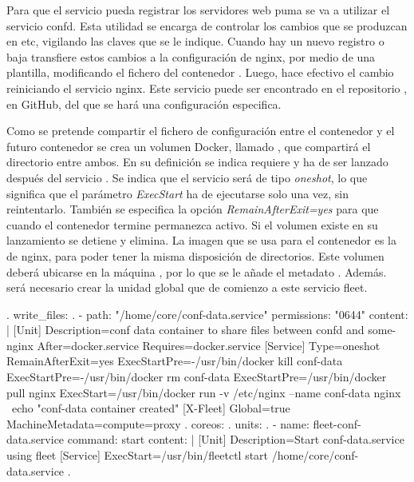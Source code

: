 Para que el servicio  pueda registrar los servidores web puma se va a utilizar el servicio confd. Esta utilidad se encarga de controlar los cambios que se produzcan en etc, vigilando las claves que se le indique. Cuando hay un nuevo registro o baja transfiere estos cambios a la configuración de nginx, por medio de una plantilla, modificando el fichero  del contenedor . Luego, hace efectivo el cambio reiniciando el servicio nginx. Este servicio puede ser encontrado en el repositorio , en GitHub, del que se hará una configuración especifica.

Como se pretende compartir el fichero de configuración  entre el contenedor  y el futuro contenedor  se crea un volumen Docker, llamado , que compartirá el directorio  entre ambos. En su definición se indica requiere y ha de ser lanzado después del servicio . Se indica que el servicio será de tipo \textit{oneshot}, lo que significa que el parámetro \textit{ExecStart} ha de ejecutarse solo una vez, sin reintentarlo. También se especifica la opción \textit{RemainAfterExit=yes} para que cuando el contenedor termine permanezca activo. Si el volumen existe en su lanzamiento se detiene y elimina. La imagen que se usa para el contenedor es la de nginx, para poder tener la misma disposición de directorios. Este volumen deberá ubicarse en la máquina , por lo que se le añade el metadato . Además. será necesario crear la unidad global  que de comienzo a este servicio fleet.

\begin{codelisting}
\label{code:conf-data}
\begin{code}
.
write_files:
.
  - path: "/home/core/conf-data.service"
    permissions: "0644"
    content: |
      [Unit] 
      Description=conf data container to share files between confd and some-nginx
      After=docker.service
      Requires=docker.service
      [Service] 
      Type=oneshot
      RemainAfterExit=yes
      ExecStartPre=-/usr/bin/docker kill conf-data 
      ExecStartPre=-/usr/bin/docker rm conf-data
      ExecStartPre=/usr/bin/docker pull nginx 
      ExecStart=/usr/bin/docker run -v /etc/nginx --name conf-data nginx \
      echo "conf-data container created" 
      [X-Fleet]
      Global=true
      MachineMetadata=compute=proxy
  .
coreos:
  .
  units:
  .
  - name: fleet-conf-data.service
    command: start
    content: |
      [Unit]
      Description=Start conf-data.service using fleet
      [Service]
      ExecStart=/usr/bin/fleetctl start /home/core/conf-data.service
  .
\end{code}
\end{codelisting}

